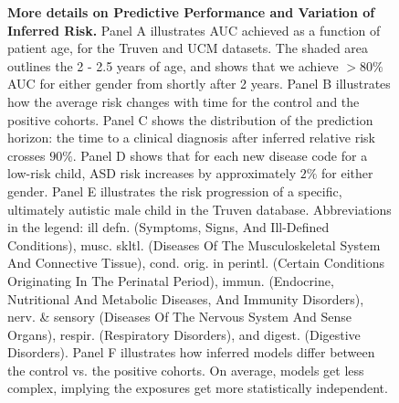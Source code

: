 \documentclass[3p,super,numbers,sort&compress,preprint,10pt]{elsarticle}
\renewcommand{\captionN}[1]{\caption{\color{CadetBlue4!80!black} \sffamily \fontsize{9}{10}\selectfont #1  }}
\newif\ifFIGS
\def\treatment{positive\xspace}
\begin{document}
\begin{figure}[!ht]
    \captionN{\textbf{More details on Predictive Performance and Variation of Inferred Risk.} Panel A illustrates AUC achieved as a function of
      patient age, for the Truven and UCM datasets. The shaded area outlines the 2 - 2.5  years of age, and  shows that we achieve $>80\%$ AUC for either gender from shortly after 2 years.   Panel B illustrates how the average risk changes with time for the control and the positive cohorts. Panel C shows the distribution of the prediction horizon: the time to a clinical diagnosis after inferred  relative risk crosses $90\%$. Panel D shows that for each new disease code for a low-risk child, ASD risk increases by approximately $2\%$ for either gender. Panel E illustrates the risk progression of a specific, ultimately autistic male child in the Truven database. Abbreviations in the legend: ill defn. (Symptoms, Signs, And Ill-Defined Conditions),   musc. skltl. (Diseases Of The Musculoskeletal System And Connective Tissue), cond. orig. in perintl. (Certain Conditions Originating In The Perinatal Period), immun. (Endocrine, Nutritional And Metabolic Diseases, And Immunity Disorders), nerv. \& sensory (Diseases Of The Nervous System And Sense Organs), respir. (Respiratory Disorders), and digest. (Digestive Disorders). Panel F illustrates  how inferred models differ between the control vs. the \treatment cohorts. On average, models get less complex, implying the exposures get more statistically independent.}\label{fig2}
\end{figure}
\else
{}\label{fig2}
\fi
\ifFIGS
\end{document}

